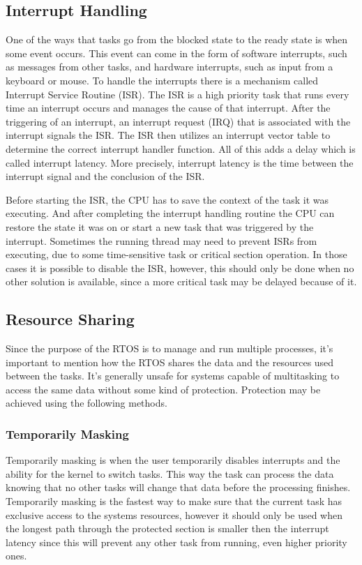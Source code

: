 \subsection{Interrupt Handling}
One of the ways that tasks go from the blocked state to the ready state is when some event occurs. This event can come in the form of software interrupts, such as messages from other tasks, and hardware interrupts, such as input from a keyboard or mouse. To handle the interrupts there is a mechanism called Interrupt Service Routine (ISR). The ISR is a high priority task that runs every time an interrupt occurs and manages the cause of that interrupt. After the triggering of an interrupt, an interrupt request (IRQ) that is associated with the interrupt signals the ISR. The ISR then utilizes an interrupt vector table to determine the correct interrupt handler function. All of this adds a delay which is called interrupt latency. More precisely, interrupt latency is the time between the interrupt signal and the conclusion of the ISR.

Before starting the ISR, the CPU has to save the context of the task it was executing. And after completing the interrupt handling routine the CPU can restore the state it was on or start a new task that was triggered by the interrupt. Sometimes the running thread may need to prevent ISRs from executing, due to some time-sensitive task or critical section operation. In those cases it is possible to disable the ISR, however, this should only be done when no other solution is available, since a more critical task may be delayed because of it.


\subsection{Resource Sharing}
Since the purpose of the RTOS is to manage and run multiple processes, it's important to mention how the RTOS shares the data and the resources used between the tasks. It's generally unsafe for systems capable of multitasking to access the same data without some kind of protection. Protection may be achieved using the following methods.

\subsubsection{Temporarily Masking}
Temporarily masking is when the user temporarily disables interrupts and the ability for the kernel to switch tasks. This way the task can process the data knowing that no other tasks will change that data before the processing finishes. Temporarily masking is the fastest way to make sure that the current task has exclusive access to the systems resources, however it should only be used when the longest path through the protected section is smaller then the interrupt latency since this will prevent  any other task from running, even higher priority ones.

